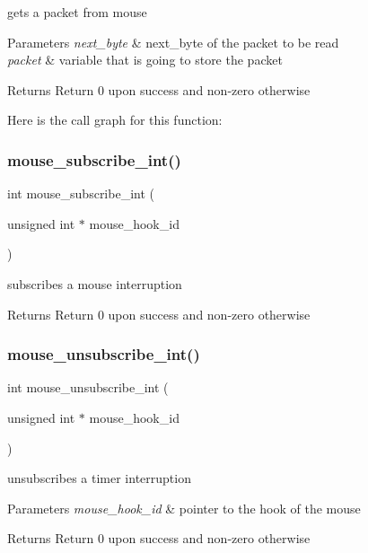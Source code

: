 gets a packet from mouse 


\begin{DoxyParams}{Parameters}
{\em next\+\_\+byte} & next\+\_\+byte of the packet to be read \\
\hline
{\em packet} & variable that is going to store the packet \\
\hline
\end{DoxyParams}
\begin{DoxyReturn}{Returns}
Return 0 upon success and non-\/zero otherwise 
\end{DoxyReturn}
Here is the call graph for this function\+:
\hypertarget{group__mouse_gad607aaa8fd9833789fcd2b99c86dfc34}{}\label{group__mouse_gad607aaa8fd9833789fcd2b99c86dfc34} 
\subsubsection{\texorpdfstring{mouse\+\_\+subscribe\+\_\+int()}{mouse\_subscribe\_int()}}
{\footnotesize\ttfamily int mouse\+\_\+subscribe\+\_\+int (\begin{DoxyParamCaption}\item[{unsigned int $\ast$}]{mouse\+\_\+hook\+\_\+id }\end{DoxyParamCaption})}



subscribes a mouse interruption 

\begin{DoxyReturn}{Returns}
Return 0 upon success and non-\/zero otherwise 
\end{DoxyReturn}
\hypertarget{group__mouse_gaa40354aab63adaf9ecddd01255efd918}{}\label{group__mouse_gaa40354aab63adaf9ecddd01255efd918} 
\subsubsection{\texorpdfstring{mouse\+\_\+unsubscribe\+\_\+int()}{mouse\_unsubscribe\_int()}}
{\footnotesize\ttfamily int mouse\+\_\+unsubscribe\+\_\+int (\begin{DoxyParamCaption}\item[{unsigned int $\ast$}]{mouse\+\_\+hook\+\_\+id }\end{DoxyParamCaption})}



unsubscribes a timer interruption 


\begin{DoxyParams}{Parameters}
{\em mouse\+\_\+hook\+\_\+id} & pointer to the hook of the mouse\\
\hline
\end{DoxyParams}
\begin{DoxyReturn}{Returns}
Return 0 upon success and non-\/zero otherwise 
\end{DoxyReturn}
